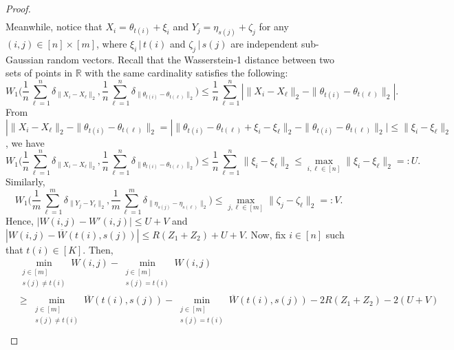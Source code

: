 \documentclass[11pt,letterpaper]{article}
\theoremstyle{definition}
\numberwithin{equation}{section}
\newcommand{\R}{\mathbb{R}}
\begin{document}
\begin{proof}
\begin{equation*}
\begin{split}
        \end{split}
    \end{equation*}
    Meanwhile, notice that $X_i = \theta_{t(i)} + \xi_i$ and $Y_j = \eta_{s(j)} + \zeta_j$ for any $(i, j) \in [n] \times [m]$, where $\xi_i \, | \, t(i)$ and $\zeta_j \, | \, s(j)$ are independent sub-Gaussian random vectors. Recall that the Wasserstein-1 distance between two sets of points in $\R$ with the same cardinality satisfies the following:
    \begin{equation*}
        W_1\bigg(\frac{1}{n} \sum_{\ell = 1}^{n} \delta_{\|X_i - X_\ell\|_2}, \frac{1}{n} \sum_{\ell = 1}^{n} \delta_{\|\theta_{t(i)} - \theta_{t(\ell)}\|_2}\bigg) \le \frac{1}{n} \sum_{\ell = 1}^{n}\left|\|X_i - X_\ell\|_2 - \|\theta_{t(i)} - \theta_{t(\ell)}\|_2\right|.
    \end{equation*}
    From $|\|X_i - X_\ell\|_2 - \|\theta_{t(i)} - \theta_{t(\ell)}\|_2 = |\|\theta_{t(i)} - \theta_{t(\ell)} + \xi_i - \xi_\ell\|_2 - \|\theta_{t(i)} - \theta_{t(\ell)}\|_2| \le \|\xi_i - \xi_\ell\|_2$, we have 
    \begin{equation*}
        W_1\bigg(\frac{1}{n} \sum_{\ell = 1}^{n} \delta_{\|X_i - X_\ell\|_2}, \frac{1}{n} \sum_{\ell = 1}^{n} \delta_{\|\theta_{t(i)} - \theta_{t(\ell)}\|_2}\bigg) \le \frac{1}{n} \sum_{\ell = 1}^{n} \|\xi_i - \xi_\ell\|_2 \le \max_{i, \ell \in [n]} \|\xi_i - \xi_\ell\|_2 =: U.
    \end{equation*}
    Similarly, 
    \begin{equation*}
        W_1\bigg(\frac{1}{m} \sum_{\ell = 1}^{m} \delta_{\|Y_j - Y_\ell\|_2}, \frac{1}{m} \sum_{\ell = 1}^{m} \delta_{\|\eta_{s(j)} - \eta_{s(\ell)}\|_2}\bigg) \le \max_{j, \ell \in [m]} \|\zeta_j - \zeta_\ell\|_2 =: V.
    \end{equation*}
    Hence, $|W(i, j) - W'(i, j)| \le U + V$ and $|W(i, j) - \overline{W}(t(i), s(j))| \le R (Z_1 + Z_2) + U + V$. Now, fix $i \in [n]$ such that $t(i) \in [K]$. Then,
    \begin{equation}
        \label{eq:gap_and_deviation}
        \begin{split}
            & \min_{\substack{j \in [m] \\ s(j) \neq t(i)}} W(i, j) - \min_{\substack{j \in [m] \\ s(j) = t(i)}} W(i, j) \\
            & \ge \min_{\substack{j \in [m] \\ s(j) \neq t(i)}} \overline{W}(t(i), s(j)) - \min_{\substack{j \in [m] \\ s(j) = t(i)}} \overline{W}(t(i), s(j)) - 2 R (Z_1 + Z_2) - 2 (U + V) \\

\end{split}
\end{equation}
\end{proof}
\end{document}
